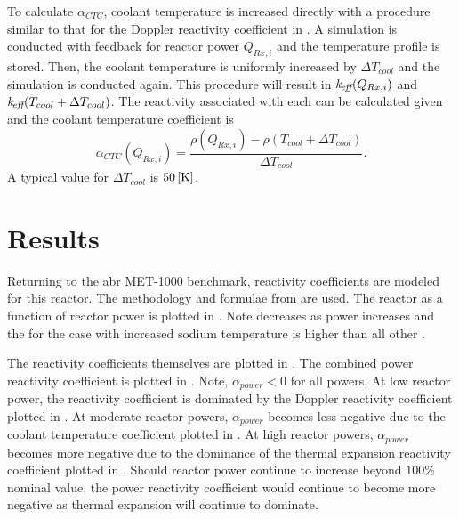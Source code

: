     To calculate $\alpha_{CTC}$, coolant temperature is increased directly with
    a procedure similar to that for the Doppler reactivity coefficient in
    . A simulation is
    conducted with feedback for reactor power $Q_{Rx,i}$ and the temperature
    profile is stored. Then, the coolant temperature is uniformly increased by
    $\Delta T_{cool}$ and the simulation is conducted again. This procedure will
    result in $k_{\!\mbox{\scriptsize \em eff}}(Q_{Rx,i})$ and ${k_{\!\mbox{\scriptsize \em eff}}(T_{cool} + \Delta T_{cool})}$. The
    reactivity associated with each \keff can be calculated given
     and the coolant temperature coefficient is
    \begin{equation}
      \label{eq:coolant_temperature_reactivity_coefficient}
      \alpha_{CTC}(Q_{Rx,i}) = \frac{\rho(Q_{Rx,i}) - \rho(T_{cool} + 
        \Delta T_{cool})} {\Delta T_{cool}}.
    \end{equation}
    A typical value for $\Delta T_{cool}$ is $50 \left[\text{{K}}\right]$.

\section{Results}
\label{sec:results}
  Returning to the \gls{abr} MET-1000 benchmark, reactivity coefficients are
  modeled for this reactor. The methodology and formulae from
   are used. The reactor \keff as a function
  of reactor power is plotted in . Note \keff decreases
  as power increases and the \keff for the case with increased sodium
  temperature is higher than all other \keff.
  
  The reactivity coefficients themselves are plotted in
  . The combined power reactivity
  coefficient is plotted in . Note,
  $\alpha_{power} < 0$ for all powers. At low reactor power, the reactivity
  coefficient is dominated by the Doppler reactivity coefficient plotted in
  . At moderate reactor powers,
  $\alpha_{power}$ becomes less negative due to the coolant temperature
  coefficient plotted in .
  At high reactor powers, $\alpha_{power}$ becomes more negative due to the
  dominance of the thermal expansion reactivity coefficient plotted in
  . Should reactor power
  continue to increase beyond $100\%$ nominal value, the power reactivity
  coefficient would continue to become more negative as thermal expansion will
  continue to dominate.

